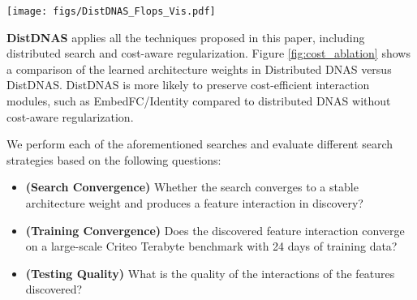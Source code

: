 \begin{figure*}[t]
    \begin{center}
    \texttt{[image: figs/DistDNAS\_Flops\_Vis.pdf]}
    \vspace{-0.5em}
    \caption{Comparison of learned architecture weights under distributed DNAS versus DistDNAS.}
    \vspace{-1em}
    \label{fig:cost_ablation}    
    \end{center}
\end{figure*}

\noindent \textbf{DistDNAS} applies all the techniques proposed in this paper, including distributed search and cost-aware regularization. Figure \ref{fig:cost_ablation} shows a comparison of the learned architecture weights in Distributed DNAS versus DistDNAS.
DistDNAS is more likely to preserve cost-efficient interaction modules, such as EmbedFC/Identity compared to distributed DNAS without cost-aware regularization.


We perform each of the aforementioned searches and evaluate different search strategies based on the following questions:
\begin{itemize}[noitemsep,leftmargin=*]
    \item \textbf{(Search Convergence) }Whether the search converges to a stable architecture weight and produces a feature interaction in discovery?
    \item \textbf{(Training Convergence)} Does the discovered feature interaction converge on a large-scale Criteo Terabyte benchmark with 24 days of training data?
    \item \textbf{(Testing Quality)} What is the quality of the interactions of the features discovered?
\end{itemize}


